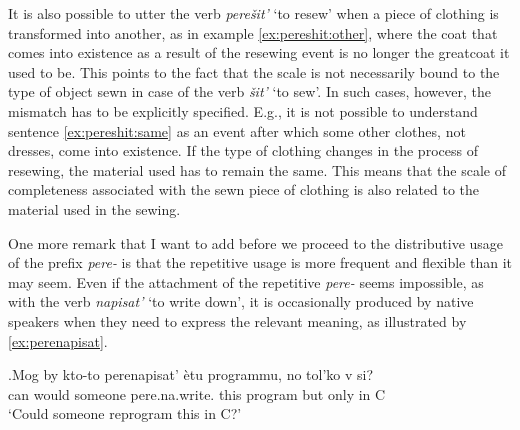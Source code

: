 It is also possible to utter the verb \textit{pere\v{s}it'} `to resew' when a piece of clothing is transformed into another, as in example \ref{ex:pereshit:other}, where the coat that comes into existence as a result of the resewing event is no longer the greatcoat it used to be. This points to the fact that the scale is not necessarily bound to the type of object sewn in case of the verb \textit{\v{s}it'} `to sew'. In such cases, however, the mismatch has to be explicitly specified. E.g., it is not possible to understand sentence \ref{ex:pereshit:same} as an event after which some other clothes, not dresses, come into existence.  If the type of clothing changes in the process of resewing, the material used has to remain the same. This means that the scale of completeness associated with the sewn piece of clothing is also related to the material used in the sewing.


One more remark that I want to add before we proceed to the distributive  usage of the prefix \textit{pere-}   is that the repetitive  usage is more frequent and flexible than it may seem. Even if the attachment of the repetitive  \textit{pere-}   seems impossible, as with the verb \textit{napisat'} `to write down', it is occasionally produced by native speakers when they need to express the relevant meaning, as illustrated by \ref{ex:perenapisat}. 

\exg.\label{ex:perenapisat}Mog by kto-to perenapisat' \`{e}tu programmu, no tol'ko v si?\\
can would someone pere.na.write. this program but only in C\\
\trans `Could someone reprogram this in C?'

